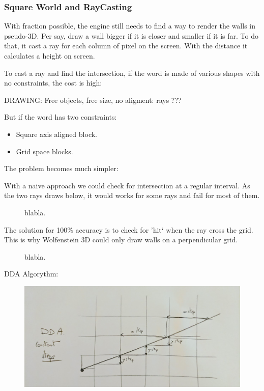  
 

\subsubsection{Square World and RayCasting}
With fraction possible, the engine still needs to find a way to render the walls in pseudo-3D. Per say, draw a wall bigger if it is closer and smaller if it is far. To do that, it cast a ray for each column of pixel on the screen. With the distance it calculates a height on screen.\\
\par
To cast a ray and find the intersection, if the word is made of various shapes with no constraints, the cost is high:\\
\par
DRAWING: Free objects, free size, no aligment: rays ???\\
\par
But if the word has two constraints:
\begin{itemize}
\item Square axis aligned block.
\item Grid space blocks.
\end{itemize}
\par
The problem becomes much simpler:\\
\par
\begin{figure}[H]
\centering
 
\end{figure}

With a naive approach we could check for intersection at a regular interval. As the two rays draws below, it would works for some rays and fail for most of them.
\begin{figure}[H]
\centering
 
 \caption{blabla.}
\end{figure}

The solution for 100\% accuracy is to check for 'hit` when the ray cross the grid. This is why Wolfenstein 3D could only draw walls on a perpendicular grid.
\begin{figure}[H]
\centering
 
 \caption{blabla.}
\end{figure}
\par
DDA Algorythm:
 \par
\begin{figure}[H]
  \centering
 \includegraphics[width=\textwidth]{imgs/dda_explainer.png}
\end{figure}
\par

